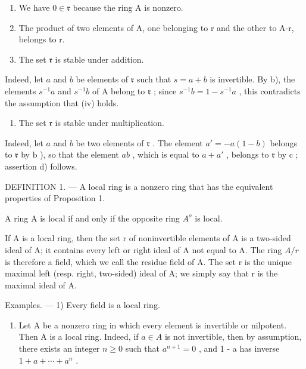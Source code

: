 \begin{enumerate}
\def\labelenumi{\alph{enumi})}
\item
  We have \(0 \in \mathfrak{r}\) because the ring A is nonzero.
\item
  The product of two elements of A, one belonging to r and the other to A-r, belongs to r.
\item
  The set \(\mathfrak{r}\) is stable under addition.
\end{enumerate}

Indeed, let \(a\) and \(b\) be elements of \(\mathfrak{r}\) such that \(s = a + b\) is invertible. By b), the elements \(s^{-1}a\) and \(s^{-1}b\) of A belong to \(\mathfrak{r}\) ; since \(s^{-1}b = 1 - s^{-1}a\) , this contradicts the assumption that (iv) holds.

\begin{enumerate}
\def\labelenumi{\alph{enumi})}
\setcounter{enumi}{3}
\tightlist
\item
  The set \(\mathfrak{r}\) is stable under multiplication.
\end{enumerate}

Indeed, let \(a\) and \(b\) be two elements of \(\mathfrak{r}\) . The element \(a' = -a(1 - b)\) belongs to \(\mathfrak{r}\) by \(\mathrm{b}\) ), so that the element \(ab\) , which is equal to \(a + a'\) , belongs to \(\mathfrak{r}\) by \(\mathrm{c}\) ; assertion d) follows.

DEFINITION 1. --- A local ring is a nonzero ring that has the equivalent properties of Proposition 1.

A ring A is local if and only if the opposite ring \(A^{o}\) is local.

If A is a local ring, then the set r of noninvertible elements of A is a two-sided ideal of A; it contains every left or right ideal of A not equal to A. The ring \(A/r\) is therefore a field, which we call the residue field of A. The set r is the unique maximal left (resp. right, two-sided) ideal of A; we simply say that r is the maximal ideal of A.

Examples. --- 1) Every field is a local ring.

\begin{enumerate}
\def\labelenumi{\arabic{enumi})}
\setcounter{enumi}{1}
\tightlist
\item
  Let A be a nonzero ring in which every element is invertible or nilpotent. Then A is a local ring. Indeed, if \(a \in A\) is not invertible, then by assumption, there exists an integer \(n \geqslant 0\) such that \(a^{n+1} = 0\) , and 1 - a has inverse \(1 + a + \cdots + a^{n}\) .
\end{enumerate}

